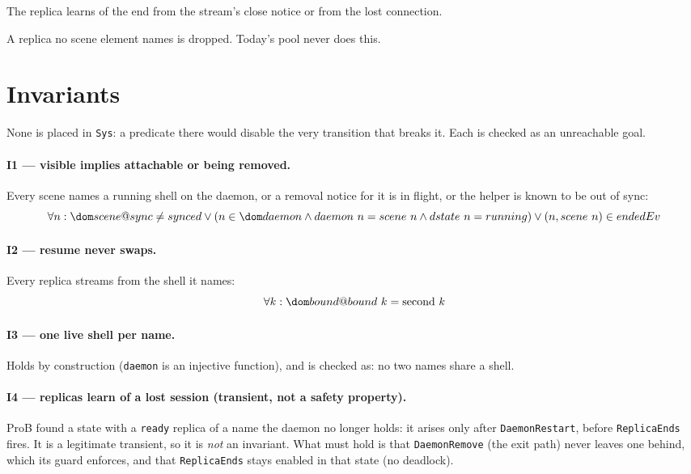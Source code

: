 \documentclass[a4paper,10pt,fleqn]{article}
\begin{document}
The replica learns of the end from the stream's close notice or from the
lost connection.



A replica no scene element names is dropped.  Today's pool never does
this.

\section{Invariants}
\label{sec:inv}

None is placed in \texttt{Sys}: a predicate there would disable the very
transition that breaks it.  Each is checked as an unreachable goal.

\paragraph{I1 --- visible implies attachable or being removed.}
Every scene names a running shell on the daemon, or a removal notice for
it is in flight, or the helper is known to be out of sync:
\[
  \forall n : \dom scene @ sync \neq synced \lor
    (n \in \dom daemon \land daemon~n = scene~n \land dstate~n = running)
    \lor (n , scene~n) \in endedEv
\]

\paragraph{I2 --- resume never swaps.}
Every replica streams from the shell it names:
\[
  \forall k : \dom bound @ bound~k = \mathrm{second}~k
\]

\paragraph{I3 --- one live shell per name.}
Holds by construction (\texttt{daemon} is an injective function), and is
checked as: no two names share a shell.

\paragraph{I4 --- replicas learn of a lost session (transient, not a safety property).}
ProB found a state with a \texttt{ready} replica of a name the daemon
no longer holds: it arises only after \texttt{DaemonRestart}, before
\texttt{ReplicaEnds} fires.  It is a legitimate transient, so it is
\emph{not} an invariant.  What must hold is that \texttt{DaemonRemove}
(the exit path) never leaves one behind, which its guard enforces, and
that \texttt{ReplicaEnds} stays enabled in that state (no deadlock).
\end{document}
